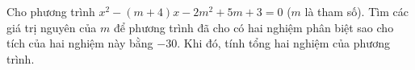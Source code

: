  \begin{ex}%
 Cho phương trình $x^2-(m+4)x-2m^2+5m+3=0$ ($m$ là tham số). Tìm các giá trị nguyên của $m$ để phương trình đã cho có hai nghiệm phân biệt sao cho tích của hai nghiệm này bằng $-30$. Khi đó, tính tổng hai nghiệm của phương trình.
 \end{ex}
 
